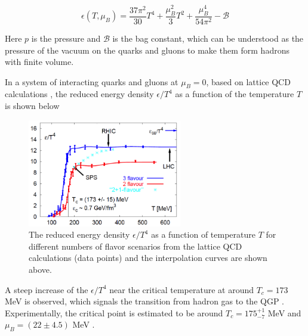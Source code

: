 \begin{equation}
\epsilon(T,\mu_B) = \frac{37\pi^2}{30} T^4 + \frac{\mu_B^2}{3}T^2 + \frac{\mu_B^4}{54\pi^2} -  \mathcal{B}
\end{equation}

Here $p$ is the pressure and $\mathcal{B}$ is the bag constant, which can be understood as the pressure of the vacuum on the quarks and gluons to make them form hadrons with finite volume.

In a system of interacting quarks and gluons at $\mu_B=0$, based on lattice QCD calculations \cite{LatticeQGP}, the reduced energy density $\epsilon/T^4$ as a function of the temperature $T$ is shown below


\begin{figure}[hbtp]
\begin{center}
\includegraphics[width=0.60\textwidth]{Figures/Chapter1/LQCDNew.png}
\caption{The reduced energy density $\epsilon/T^4$ as a function of temperature $T$ for different numbers of flavor scenarios from the lattice QCD calculations (data points) and the interpolation curves are shown above.}
\label{QCDPhaseDiagram}
\end{center}
\end{figure} 


A steep increase of the $\epsilon/T^4$ near the critical temperature at around $T_c  = 173$ MeV is observed, which signals the transition from hadron gas to the QGP \cite{PhaseTrans}. Experimentally, the critical point is estimated to be around $T_c = 175^{+1}_{-7}$ MeV and $\mu_B = (22 \pm 4.5)$ MeV \cite{CriticalPointEX} .






